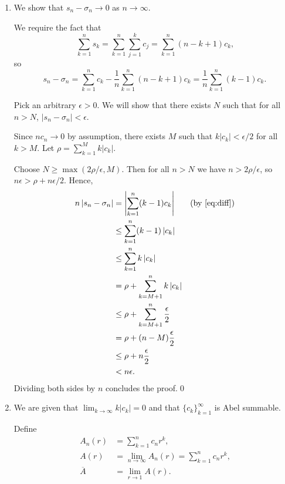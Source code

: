 \documentclass[oneside]{article}
\newcommand\abs[1]{\left|#1\right|}
\begin{document}
  \begin{enumerate}[label=(\alph*)]
    \item We show that $s_n - \sigma_n \to 0$ as $n \to \infty$.

    We require the fact that \[
      \sum_{k=1}^n s_k
      = \sum_{k=1}^n \sum_{j=1}^k c_j
      = \sum_{k=1}^n (n - k + 1)c_k
      \text{,}
    \] so \begin{equation}
      \label{eq:diff}
      s_n - \sigma_n
      = \sum_{k=1}^n c_k - \frac1n\sum_{k=1}^n (n - k + 1)c_k
      = \frac1n\sum_{k=1}^n (k - 1)c_k \text{.}
    \end{equation}

    Pick an arbitrary $\epsilon > 0$. We will show that there exists $N$ such
    that for all $n > N$, $\abs{s_n - \sigma_n} < \epsilon$.
    
    Since $nc_n \to 0$ by assumption, there exists $M$ such that
    $k\abs{c_k} < \epsilon/2$ for all $k > M$. Let
    $\rho = \sum_{k=1}^M k \abs{c_k}$.

    Choose $N \geq \max(2\rho/\epsilon, M)$. Then for all $n > N$ we have
    $n > 2\rho/\epsilon$, so $n\epsilon > \rho+n\epsilon/2$. Hence,
    \begin{align*}
      n\abs{s_n-\sigma_n}
      &= \abs{\sum_{k=1}^n (k-1)c_k} & \text{(by \eqref{eq:diff})} \\
      &\leq \sum_{k=1}^n (k-1)\abs{c_k} \\
      &\leq \sum_{k=1}^n k\abs{c_k} \\
      &= \rho + \sum_{k=M+1}^n k\abs{c_k} \\
      &\leq \rho + \sum_{k=M+1}^n \frac{\epsilon}{2} \\
      &= \rho + (n-M)\frac{\epsilon}{2} \\
      &\leq \rho + n\frac{\epsilon}{2} \\
      &< n\epsilon \text{.}
    \end{align*} Dividing both sides by $n$ concludes the proof.\qed

  \item
    We are given that $\lim_{k\to\infty}k\abs{c_k} = 0$ and that $\{c_k\}_{k=1}^\infty$ is Abel summable.

    Define \begin{align*}
      A_n(r) &= \sum_{k=1}^n c_nr^k \text{,} \\
      A(r) &= \lim_{n\to\infty}A_n(r) = \sum_{k=1}^n c_nr^k \text{,} \\
      \overline{A} &= \lim_{r\to1} A(r) \text{.}
    \end{align*}


\end{enumerate}
\end{document}
